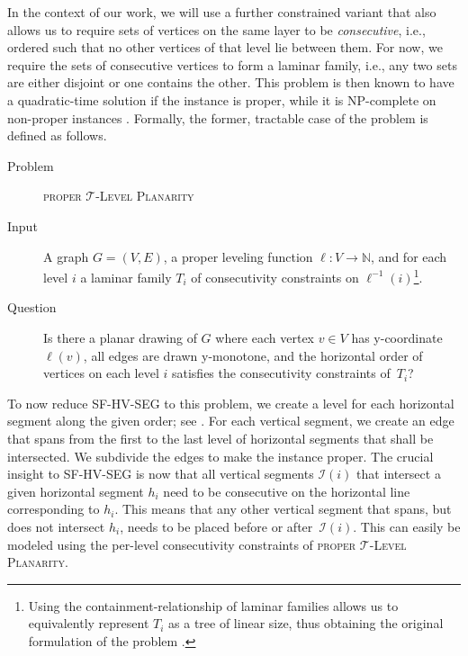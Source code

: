 \documentclass[runningheads]{llncs}
\newcommand{\myproblem}[3]{
  \par
\begin{description}
      \item[Problem] #1
      \item[Input] #2
      \item[Question] #3
    \end{description}
\par
}
\newcommand{\tlp}{\textsc{proper $\mathcal T$-Level Planarity}\xspace}
\newcommand{\hvp}{\textsc{SF-HV-SEG}\xspace}
\begin{document}
In the context of our work, we will use a further constrained variant that also allows us to require sets of vertices on the same layer to be \emph{consecutive}, i.e., ordered such that no other vertices of that level lie between them.
For now, we require the sets of consecutive vertices to form a laminar family, i.e., any two sets are either disjoint or one contains the other.
This problem is then known to have a quadratic-time solution if the instance is proper, while it is NP-complete on non-proper instances \cite{albfr-ibpcl-15,albfr-ibpcl-14}.
Formally, the former, tractable case of the problem is defined as follows.

\myproblem{\tlp}{
  A graph $G=(V,E)$, a proper leveling function $\ell : V \to \mathbb{N}$, and for each level $i$ a laminar family $T_i$ of consecutivity constraints on $\ell^{-1}(i)$\footnote{Using the containment-relationship of laminar families allows us to equivalently represent $T_i$ as a tree of linear size, thus obtaining the original formulation of the problem \cite{albfr-ibpcl-15}.}.
}{
  Is there a planar drawing of $G$ where each vertex $v\in V$ has y-coordinate $\ell(v)$,
  all edges are drawn y-monotone, and
  the horizontal order of vertices on each level $i$ satisfies the consecutivity constraints of~$T_i$?
}

To now reduce \hvp to this problem, we create a level for each horizontal segment along the given order; see .
For each vertical segment, we create an edge that spans from the first to the last level of horizontal segments that shall be intersected.
We subdivide the edges to make the instance proper.
The crucial insight to \hvp is now that all vertical segments $\mathcal I(i)$ that intersect a given horizontal segment $h_i$ need to be consecutive on the horizontal line corresponding to $h_i$.
This means that any other vertical segment that spans, but does not intersect $h_i$, needs to be placed before or after~$\mathcal I(i)$.
This can easily be modeled using the per-level consecutivity constraints of \tlp.
\end{document}
